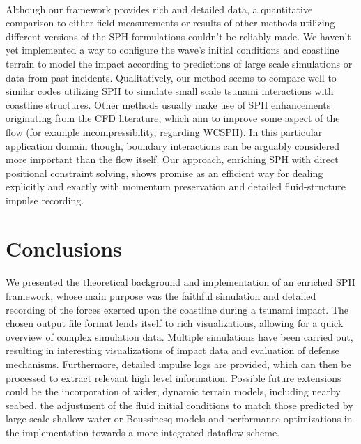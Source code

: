 \documentclass{llncs}
\begin{document}
\paragraph{} Although our framework provides rich and detailed data, a quantitative
comparison to either field measurements or results of other methods utilizing different
versions of the SPH formulations couldn't be reliably made. We haven't yet implemented a
way to configure the wave's initial conditions and coastline terrain to model the impact
according to predictions of large scale simulations or data from past
incidents. Qualitatively, our method seems to compare well to similar codes utilizing SPH
to simulate small scale tsunami interactions with coastline structures. Other methods
usually make use of SPH enhancements originating from the CFD literature, which aim to
improve some aspect of the flow (for example incompressibility, regarding WCSPH). In this
particular application domain though, boundary interactions can be arguably considered
more important than the flow itself. Our approach, enriching SPH with direct positional
constraint solving, shows promise as an efficient way for dealing explicitly and exactly
with momentum preservation and detailed fluid-structure impulse recording.

\section{Conclusions}

\paragraph{} We presented the theoretical background and implementation of an enriched SPH
framework, whose main purpose was the faithful simulation and detailed recording of the
forces exerted upon the coastline during a tsunami impact. The chosen output file format
lends itself to rich visualizations, allowing for a quick overview of complex simulation
data. Multiple simulations have been carried out, resulting in interesting visualizations
of impact data and evaluation of defense mechanisms. Furthermore, detailed impulse logs
are provided, which can then be processed to extract relevant high level
information. Possible future extensions could be the incorporation of wider, dynamic
terrain models, including nearby seabed, the adjustment of the fluid initial conditions to
match those predicted by large scale shallow water or Boussinesq models and performance
optimizations in the implementation towards a more integrated dataflow scheme.
\end{document}

